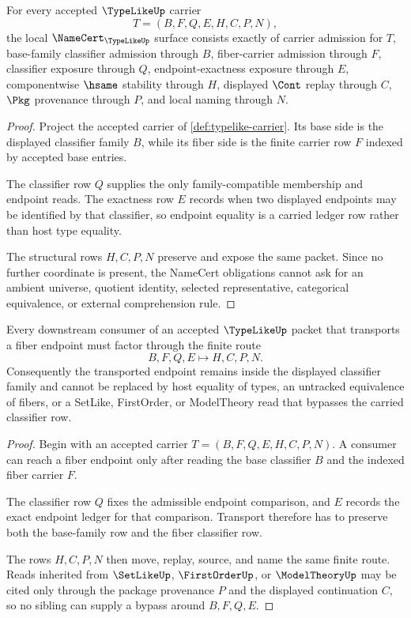 \begin{theorem}
\label{thm:typelike-namecert-obligations}
For every accepted $\TypeLikeUp$ carrier
$$
T=(B,F,Q,E,H,C,P,N),
$$
the local $\NameCert_{\TypeLikeUp}$ surface consists exactly of carrier admission for $T$, base-family classifier admission through $B$, fiber-carrier admission through $F$, classifier exposure through $Q$, endpoint-exactness exposure through $E$, componentwise $\hsame$ stability through $H$, displayed $\Cont$ replay through $C$, $\Pkg$ provenance through $P$, and local naming through $N$.
\end{theorem}
\begin{proof}
Project the accepted carrier of \autoref{def:typelike-carrier}. Its base side is the displayed classifier family $B$, while its fiber side is the finite carrier row $F$ indexed by accepted base entries.

The classifier row $Q$ supplies the only family-compatible membership and endpoint reads. The exactness row $E$ records when two displayed endpoints may be identified by that classifier, so endpoint equality is a carried ledger row rather than host type equality.

The structural rows $H,C,P,N$ preserve and expose the same packet. Since no further coordinate is present, the NameCert obligations cannot ask for an ambient universe, quotient identity, selected representative, categorical equivalence, or external comprehension rule.
\end{proof}

\begin{theorem}
\label{thm:typelike-classifier-transport}
Every downstream consumer of an accepted $\TypeLikeUp$ packet that transports a fiber endpoint must factor through the finite route
$$
B,F,Q,E \longmapsto H,C,P,N .
$$
Consequently the transported endpoint remains inside the displayed classifier family and cannot be replaced by host equality of types, an untracked equivalence of fibers, or a SetLike, FirstOrder, or ModelTheory read that bypasses the carried classifier row.
\end{theorem}
\begin{proof}
Begin with an accepted carrier $T=(B,F,Q,E,H,C,P,N)$. A consumer can reach a fiber endpoint only after reading the base classifier $B$ and the indexed fiber carrier $F$.

The classifier row $Q$ fixes the admissible endpoint comparison, and $E$ records the exact endpoint ledger for that comparison. Transport therefore has to preserve both the base-family row and the fiber classifier row.

The rows $H,C,P,N$ then move, replay, source, and name the same finite route. Reads inherited from $\SetLikeUp$, $\FirstOrderUp$, or $\ModelTheoryUp$ may be cited only through the package provenance $P$ and the displayed continuation $C$, so no sibling can supply a bypass around $B,F,Q,E$.
\end{proof}

